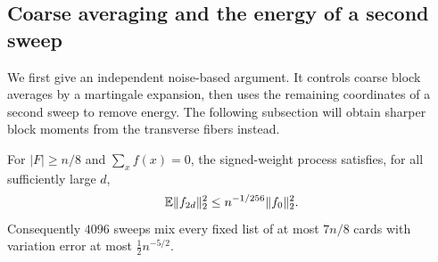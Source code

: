 \subsection{Coarse averaging and the energy of a second sweep}
\label{cycles:coarse}

We first give an independent noise-based argument. It controls coarse
block averages by a martingale expansion, then uses the remaining
coordinates of a second sweep to remove energy. The following subsection
will obtain sharper block moments from the transverse fibers instead.

\begin{proposition}
\label{cycles:coarse-prop}
For $|F|\ge n/8$ and $\sum_xf(x)=0$, the signed-weight process satisfies,
for all sufficiently large $d$,
\begin{equation}\label{cycles:coarse-contraction}
 \mathbb E\|f_{2d}\|_2^2\le n^{-1/256}\|f_0\|_2^2.
\end{equation}
Consequently $4096$ sweeps mix every fixed list of at most $7n/8$ cards
with variation error at most $\frac12 n^{-5/2}$.
\end{proposition}
